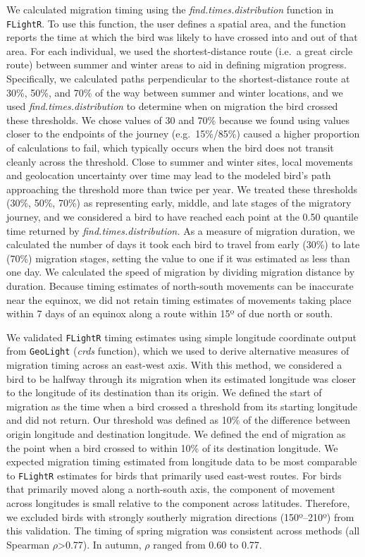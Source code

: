 \documentclass[a4paper, nobind]{templates/ociamthesis}
\begin{document}
We calculated migration timing using the \emph{find.times.distribution} function in \texttt{FLightR}. To use this function, the user defines a spatial area, and the function reports the time at which the bird was likely to have crossed into and out of that area. For each individual, we used the shortest-distance route (i.e.~a great circle route) between summer and winter areas to aid in defining migration progress. Specifically, we calculated paths perpendicular to the shortest-distance route at 30\%, 50\%, and 70\% of the way between summer and winter locations, and we used \emph{find.times.distribution} to determine when on migration the bird crossed these thresholds. We chose values of 30 and 70\% because we found using values closer to the endpoints of the journey (e.g.~15\%/85\%) caused a higher proportion of calculations to fail, which typically occurs when the bird does not transit cleanly across the threshold. Close to summer and winter sites, local movements and geolocation uncertainty over time may lead to the modeled bird's path approaching the threshold more than twice per year. We treated these thresholds (30\%, 50\%, 70\%) as representing early, middle, and late stages of the migratory journey, and we considered a bird to have reached each point at the 0.50 quantile time returned by \emph{find.times.distribution.} As a measure of migration duration, we calculated the number of days it took each bird to travel from early (30\%) to late (70\%) migration stages, setting the value to one if it was estimated as less than one day. We calculated the speed of migration by dividing migration distance by duration. Because timing estimates of north-south movements can be inaccurate near the equinox, we did not retain timing estimates of movements taking place within 7 days of an equinox along a route within 15º of due north or south.

We validated \texttt{FLightR} timing estimates using simple longitude coordinate output from \texttt{GeoLight} (\emph{crds} function), which we used to derive alternative measures of migration timing across an east-west axis. With this method, we considered a bird to be halfway through its migration when its estimated longitude was closer to the longitude of its destination than its origin. We defined the start of migration as the time when a bird crossed a threshold from its starting longitude and did not return. Our threshold was defined as 10\% of the difference between origin longitude and destination longitude. We defined the end of migration as the point when a bird crossed to within 10\% of its destination longitude. We expected migration timing estimated from longitude data to be most comparable to \texttt{FLightR} estimates for birds that primarily used east-west routes. For birds that primarily moved along a north-south axis, the component of movement across longitudes is small relative to the component across latitudes. Therefore, we excluded birds with strongly southerly migration directions (150º--210º) from this validation. The timing of spring migration was consistent across methods (all Spearman \(\rho\)\textgreater0.77). In autumn, \(\rho\) ranged from 0.60 to 0.77.
\end{document}
